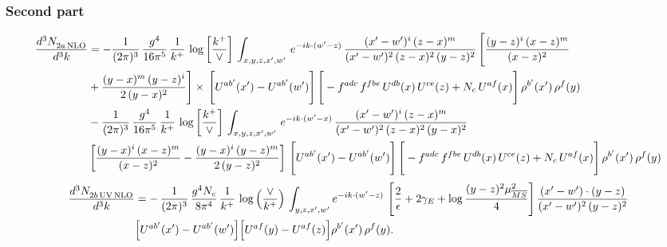\documentclass[9pt]{article}
\numberwithin{equation}{section}
\begin{document}
\subsubsection*{Second part}
\begin{align}
    \frac{d^{3}N_{2a\,\rm NLO}^{\rm}}{d^{3}k}  & =   - \frac{1}{(2\pi)^{3}}\, \frac{g^{4}}{16\pi^{5}}\,\frac{1}{k^{+}}\,\log{\left[\frac{k^{+}}{\vee}\right]}\, \int_{x,y,z,x',w'}\, e^{-ik\cdot(w'-z)}\,\frac{(x'-w')^{i}\,(z-x)^{m}}{(x'-w')^{2}\,(z-x)^{2}\, (y-z)^{2}}\,\Bigg[\frac{(y-z)^{i}\,(x-z)^{m}}{(x-z)^{2}}\notag \\ & +\frac{(y-x)^{m}\,(y-z)^{i}}{2\,(y-x)^{2}}\Bigg]\times\, \Bigg[U^{ab'}(x')-U^{ab'}(w')\Bigg]\,\Bigg[-f^{adc}\,f^{fbe}\,U^{db}(x)\,U^{ce}(z)+N_{c}\,U^{af}(x)\Bigg]\,\rho^{b'}(x')\,\rho^{f}(y)\notag \\ & - \frac{1}{(2\pi)^{3}}\, \frac{g^{4}}{16\pi^{5}}\,\frac{1}{k^{+}}\,\log{\left[\frac{k^{+}}{\vee}\right]}\, \int_{x,y,z,x',w'}\,e^{-ik\cdot(w'-x)}\,\frac{(x'-w')^{i}\,(z-x)^{m}}{(x'-w')^{2}\,(z-x)^{2}\,(y-x)^{2}} \notag \\ &\left[\frac{(y-x)^{i}\,(x-z)^{m}}{(x-z)^{2}}-\frac{(y-x)^{i}\,(y-z)^{m}}{2\,(y-z)^{2}}\right]\, \Bigg[U^{ab'}(x')-U^{ab'}(w')\Bigg]\,\Bigg[-f^{adc}\,f^{fbe}\,U^{db}(x)\,U^{ce}(z)+N_{c}\,U^{af}(x)\Bigg]\,\rho^{b'}(x')\,\rho^{f}(y)
\end{align}
\begin{align}
\frac{d^{3}N_{2b\,\rm UV\, NLO}^{\rm}}{d^{3}k} & = -\,\frac{1}{(2\pi)^{3}}\,\frac{g^{4}N_{c}}{8\pi^{4}}\,\frac{1}{k^{+}}\,\log\Big(\frac{\vee}{k^{+}}\Big)\,\int_{y,z,x',w'}e^{-ik\cdot(w'-z)}\, \left[\frac{2}{\epsilon}+2\gamma_{E}+\log\frac{(y-z)^{2}\mu^{2}_{\overline{MS}}}{4}\right]
\frac{(x'-w')\cdot(y-z)}{(x'-w')^{2}\,(y-z)^{2}}\notag \\ &  \Big[U^{ab'}(x')-U^{ab'}(w')\Big]\Big[U^{af}(y)-U^{af}(z)\Big]\rho^{b'}(x')\,\rho^{f}(y).
\end{align}
\end{document}

